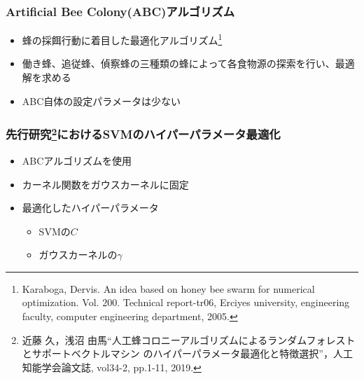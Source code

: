 \documentclass[11pt,dvipdfmx,cjk]{beamer}
\begin{document}
  \begin{frame}
    \frametitle{Artificial Bee Colony(ABC)アルゴリズム}
    \begin{itemize}
      \item 蜂の採餌行動に着目した最適化アルゴリズム\footnote{Karaboga, Dervis. An idea based on honey bee swarm for numerical optimization. Vol. 200. Technical report-tr06, Erciyes university, engineering faculty, computer engineering department, 2005.}
      \item 働き蜂、追従蜂、偵察蜂の三種類の蜂によって各食物源の探索を行い、最適解を求める
      \item ABC自体の設定パラメータは少ない
    \end{itemize}
  \end{frame}
  \begin{frame}
    \frametitle{先行研究\footnote{近藤 久，浅沼 由馬“人工蜂コロニーアルゴリズムによるランダムフォレストとサポートベクトルマシン
    のハイパーパラメータ最適化と特徴選択”，人工知能学会論文誌, vol34-2, pp.1-11, 2019.}におけるSVMのハイパーパラメータ最適化}
    \begin{itemize}
      \item ABCアルゴリズムを使用
      \item カーネル関数をガウスカーネルに固定
      \item 最適化したハイパーパラメータ
      \begin{itemize}
        \item SVMの$C$
        \item ガウスカーネルの$\gamma$
      \end{itemize}
    \end{itemize}
\end{frame}
\end{document}
